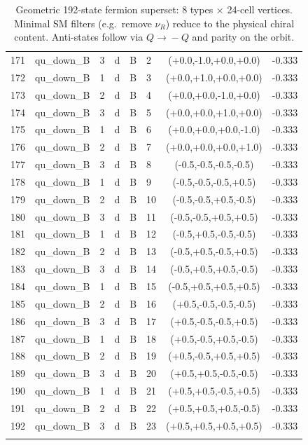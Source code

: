 \begin{longtable}{rlllllcl}
171 & qu\_down\_B & 3 & d & B & 2 & (+0.0,-1.0,+0.0,+0.0) & -0.333 \\
172 & qu\_down\_B & 1 & d & B & 3 & (+0.0,+1.0,+0.0,+0.0) & -0.333 \\
173 & qu\_down\_B & 2 & d & B & 4 & (+0.0,+0.0,-1.0,+0.0) & -0.333 \\
174 & qu\_down\_B & 3 & d & B & 5 & (+0.0,+0.0,+1.0,+0.0) & -0.333 \\
175 & qu\_down\_B & 1 & d & B & 6 & (+0.0,+0.0,+0.0,-1.0) & -0.333 \\
176 & qu\_down\_B & 2 & d & B & 7 & (+0.0,+0.0,+0.0,+1.0) & -0.333 \\
177 & qu\_down\_B & 3 & d & B & 8 & (-0.5,-0.5,-0.5,-0.5) & -0.333 \\
178 & qu\_down\_B & 1 & d & B & 9 & (-0.5,-0.5,-0.5,+0.5) & -0.333 \\
179 & qu\_down\_B & 2 & d & B & 10 & (-0.5,-0.5,+0.5,-0.5) & -0.333 \\
180 & qu\_down\_B & 3 & d & B & 11 & (-0.5,-0.5,+0.5,+0.5) & -0.333 \\
181 & qu\_down\_B & 1 & d & B & 12 & (-0.5,+0.5,-0.5,-0.5) & -0.333 \\
182 & qu\_down\_B & 2 & d & B & 13 & (-0.5,+0.5,-0.5,+0.5) & -0.333 \\
183 & qu\_down\_B & 3 & d & B & 14 & (-0.5,+0.5,+0.5,-0.5) & -0.333 \\
184 & qu\_down\_B & 1 & d & B & 15 & (-0.5,+0.5,+0.5,+0.5) & -0.333 \\
185 & qu\_down\_B & 2 & d & B & 16 & (+0.5,-0.5,-0.5,-0.5) & -0.333 \\
186 & qu\_down\_B & 3 & d & B & 17 & (+0.5,-0.5,-0.5,+0.5) & -0.333 \\
187 & qu\_down\_B & 1 & d & B & 18 & (+0.5,-0.5,+0.5,-0.5) & -0.333 \\
188 & qu\_down\_B & 2 & d & B & 19 & (+0.5,-0.5,+0.5,+0.5) & -0.333 \\
189 & qu\_down\_B & 3 & d & B & 20 & (+0.5,+0.5,-0.5,-0.5) & -0.333 \\
190 & qu\_down\_B & 1 & d & B & 21 & (+0.5,+0.5,-0.5,+0.5) & -0.333 \\
191 & qu\_down\_B & 2 & d & B & 22 & (+0.5,+0.5,+0.5,-0.5) & -0.333 \\
192 & qu\_down\_B & 3 & d & B & 23 & (+0.5,+0.5,+0.5,+0.5) & -0.333 \\
\bottomrule
\caption{Geometric 192-state fermion superset: 8 types $\times$ 24-cell vertices. Minimal SM filters (e.g.\ remove $\nu_R$) reduce to the physical chiral content. Anti-states follow via $Q\!\to\!-Q$ and parity on the orbit.}
\label{tab:fermion-192}
\end{longtable}
